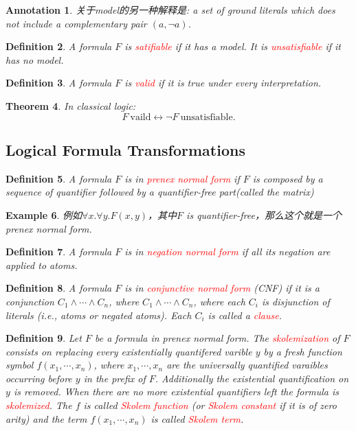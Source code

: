 \documentclass{article}
\theoremstyle{plain}
\newtheorem{theorem}{Theorem}
\newtheorem{example}[theorem]{Example}
\newtheorem{definition}[theorem]{Definition}
\newtheorem{annotation}[theorem]{Annotation}
\theoremstyle{nonumberplain}
\newcommand{\redt}[1]{\textcolor{red}{#1}}
\begin{document}
\begin{annotation}\label{model-2nd-def}
\rm 关于model的另一种解释是: a set of ground literals which does not include a complementary pair $(a, \neg a)$. 
\end{annotation}

\begin{definition}
\rm A formula $F$ is \redt{satifiable} if it has a model. It is \redt{unsatisfiable} if it has no model.
\end{definition}

\begin{definition}
\rm A formula $F$ is \redt{valid} if it is true under every interpretation.
\end{definition}

\begin{theorem}\label{vaild-and-unsat}
\rm In classical logic:
\[
	F~\text{vaild} \leftrightarrow \neg F ~\text{unsatisfiable}.
\]
\end{theorem}


\newpage
\subsection{Logical Formula Transformations}

\begin{definition}
\rm A formula $F$ is in \redt{prenex normal form} if $F$ is composed by a sequence of quantifier followed by a quantifier-free part(called the matrix)
\end{definition}

\begin{example}
\rm 例如$\forall x.\forall y. F(x,y)$，其中$F$ is quantifier-free，那么这个就是一个prenex normal form.
\end{example}

\begin{definition}
\rm A formula $F$ is in \redt{negation normal form} if all its negation are applied to atoms.
\end{definition}

\begin{definition}
\rm A formula $F$ is in \redt{conjunctive normal form} (CNF) if it is a conjunction $C_1 \wedge \cdots \wedge C_n$, where $C_1 \wedge \cdots \wedge C_n$, where each $C_i$ is disjunction of literals (i.e., atoms or negated atoms). Each $C_i$ is called a \redt{clause}.
\end{definition}

\begin{definition}
\rm Let $F$ be a formula in prenex normal form. The \redt{skolemization} of $F$ consists on replacing every existentially  quantifered varible $y$ by a fresh function symbol $f(x_1,\cdots,x_n)$, where $x_1, \cdots, x_n$ are the universally quantified varaibles occurring before $y$ in the prefix of $F$. Additionally the existential quantification on $y$ is removed. When there are no more existential quantifiers left the formula is \redt{skolemized}. The $f$ is called \redt{Skolem function} (or \redt{Skolem constant} if it is of zero arity) and the term $f(x_1,\cdots,x_n)$ is called \redt{Skolem term}.
\end{definition}
\end{document}
